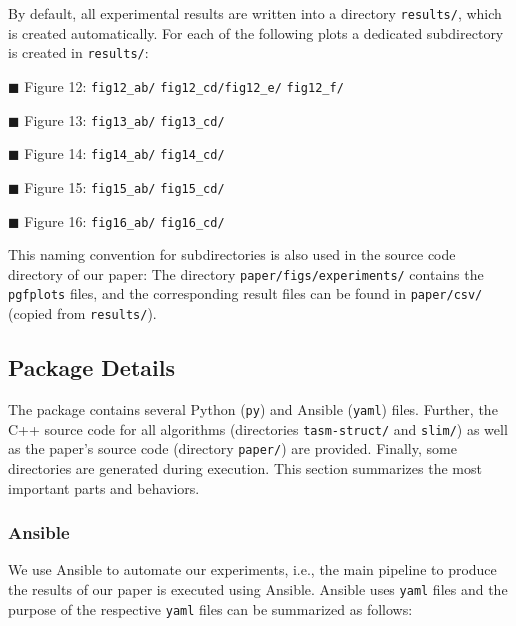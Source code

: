 \documentclass[a4, 10pt]{article}
\newenvironment{packed_item}{
\begin{itemize}
  \setlength{\itemsep}{1pt}
  \setlength{\parskip}{0pt}
  \setlength{\parsep}{0pt}
}{\end{itemize}}
\begin{document}
By default, all experimental results are written into a directory \texttt{results/}, which is created automatically. For each of the following plots a dedicated subdirectory is created in \texttt{results/}:
\begin{packed_item}
  \item[$\blacksquare$] Figure 12: \qquad \texttt{fig12\_ab/} \quad \texttt{fig12\_cd/}\quad \texttt{fig12\_e/} \quad \texttt{fig12\_f/}
  \item[$\blacksquare$] Figure 13: \qquad \texttt{fig13\_ab/} \quad \texttt{fig13\_cd/}
  \item[$\blacksquare$] Figure 14: \qquad \texttt{fig14\_ab/} \quad \texttt{fig14\_cd/}
  \item[$\blacksquare$] Figure 15: \qquad \texttt{fig15\_ab/} \quad \texttt{fig15\_cd/}
  \item[$\blacksquare$] Figure 16: \qquad \texttt{fig16\_ab/} \quad \texttt{fig16\_cd/}
\end{packed_item}

This naming convention for subdirectories is also used in the source code directory of our paper: The directory \texttt{paper/figs/experiments/} contains the \texttt{pgfplots} files, and the corresponding result files can be found in \texttt{paper/csv/} (copied from \texttt{results/}).

\subsection{Package Details}
\label{subsec:package-details}

The package contains several Python (\texttt{py}) and Ansible (\texttt{yaml}) files. Further, the C++ source code for all algorithms (directories \texttt{tasm-struct/} and \texttt{slim/}) as well as the paper's source code (directory \texttt{paper/}) are provided. Finally, some directories are generated during execution. This section summarizes the most important parts and behaviors.

\subsubsection{Ansible}

We use Ansible to automate our experiments, i.e., the main pipeline to produce the results of our paper is executed using Ansible. Ansible uses \texttt{yaml} files and the purpose of the respective \texttt{yaml} files can be summarized as follows:
\end{document}
